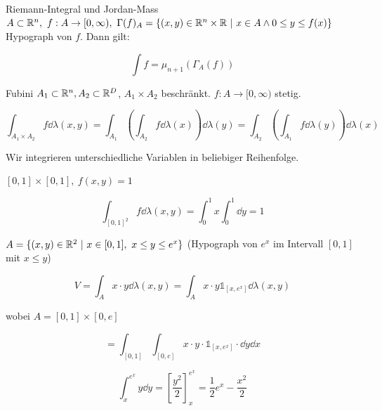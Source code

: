 \documentclass[12pt]{article}
\begin{document}
\begin{remark}{Riemann-Integral und Jordan-Mass}{}
    $A \subset \R^n,\ f: A \rightarrow [0, \infty),\ \Gamma(f)_A = \{(x, y) \in \R^n \times \R \ |\ x \in A \land 0 \leq y \leq f(x)\}$ Hypograph von $f$. Dann gilt:
    
    $$
        \int f = \mu_{n + 1} \left(\Gamma_A(f) \right)
    $$
\end{remark}

\begin{theorem}{Fubini}{}
    $A_1 \subset \mathbb{R}^n, A_2 \subset \mathbb{R}^D$, $A_1 \times A_2$ beschränkt. $f: A \rightarrow [0, \infty)$ stetig.

    $$
        \int_{A_1 \times A_2} f \dd\lambda(x, y) = \int_{A_1} \left( \int_{A_2} f \dd \lambda(x)\right) \dd \lambda(y) = \int_{A_2} \left( \int_{A_1} f \dd \lambda(y)\right) \dd \lambda(x)
    $$
\end{theorem}

Wir integrieren unterschiedliche Variablen in beliebiger Reihenfolge.

\begin{example}{}{}
    $[0, 1] \times [0, 1],\ f(x, y) = 1$
    
    $$
        \int_{[0, 1]^2} f \dd \lambda(x, y) = \int_{0}^{1} x \int_{0}^{1} \dd y = 1
    $$
\end{example}

\begin{example}{}{}
    $A = \{(x, y) \in \R^2 \ | \ x \in [0, 1],\ x \leq y \leq e^x\}$ (Hypograph von $e^x$ im Intervall $[0, 1]$ mit $x \leq y$)

    $$
        V = \int_A x \cdot y \dd \lambda(x,y) = \int_A x \cdot y \mathds{1}_{[x, e^x]} \dd \lambda(x, y)
    $$

    wobei $A = [0, 1] \times [0, e]$

    $$
        = \int_{[0, 1]} \int_{[0, e]} x \cdot y \cdot \mathds{1}_{[x, e^x]} \cdot \dd y \dd x
    $$

    $$
        \int_{x}^{e^x} y \dd y = \left[\frac{y^2}{2}\right]_{x}^{e^x} = \frac{1}{2}e^x - \frac{x^2}{2}
    $$
\end{example}
\end{document}
